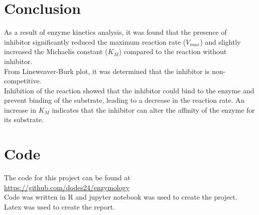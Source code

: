 \documentclass{article}
\begin{document}
\section{Conclusion}
As a result of enzyme kinetics analysis, it was found that the presence of inhibitor
significantly reduced the maximum reaction rate ($V_{max}$) and slightly increased 
the Michaelis constant ($K_M$) compared to the reaction without inhibitor.\\

From Lineweaver-Burk plot, it was determined that the inhibitor is non-competitive.\\


Inhibition of the reaction showed that the inhibitor could bind to the enzyme and 
prevent binding of the substrate, leading to a decrease in the reaction rate. 
An increase in $K_M$ indicates that the inhibitor can alter the affinity of the 
enzyme for its substrate.\\

\section{Code} %
The code for this project can be found at \url{https://github.com/dodes24/enzymology}\\
Code was written in R and jupyter notebook was used to create the project.\\
Latex was used to create the report.
\end{document}
